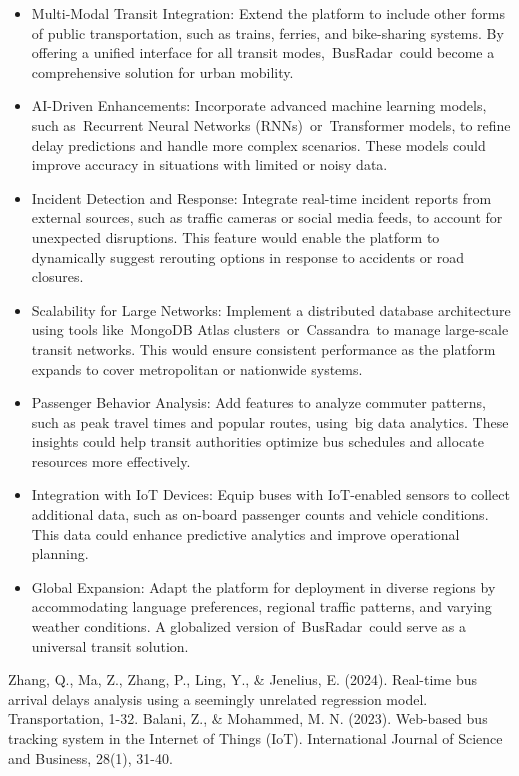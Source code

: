 \documentclass[conference]{IEEEtran}
\begin{document}
\begin{itemize}
    \item Multi-Modal Transit Integration: Extend the platform to include other forms of public transportation, such as trains, ferries, and bike-sharing systems. By offering a unified interface for all transit modes, BusRadar could become a comprehensive solution for urban mobility.
    \item AI-Driven Enhancements: Incorporate advanced machine learning models, such as Recurrent Neural Networks (RNNs) or Transformer models, to refine delay predictions and handle more complex scenarios. These models could improve accuracy in situations with limited or noisy data.
    \item Incident Detection and Response: Integrate real-time incident reports from external sources, such as traffic cameras or social media feeds, to account for unexpected disruptions. This feature would enable the platform to dynamically suggest rerouting options in response to accidents or road closures.
    \item Scalability for Large Networks: Implement a distributed database architecture using tools like MongoDB Atlas clusters or Cassandra to manage large-scale transit networks. This would ensure consistent performance as the platform expands to cover metropolitan or nationwide systems.
    \item Passenger Behavior Analysis: Add features to analyze commuter patterns, such as peak travel times and popular routes, using big data analytics. These insights could help transit authorities optimize bus schedules and allocate resources more effectively.
    \item Integration with IoT Devices: Equip buses with IoT-enabled sensors to collect additional data, such as on-board passenger counts and vehicle conditions. This data could enhance predictive analytics and improve operational planning.
    \item Global Expansion: Adapt the platform for deployment in diverse regions by accommodating language preferences, regional traffic patterns, and varying weather conditions. A globalized version of BusRadar could serve as a universal transit solution.
\end{itemize}

\begin{thebibliography}{00}
 Zhang, Q., Ma, Z., Zhang, P., Ling, Y., & Jenelius, E. (2024). Real-time bus arrival delays analysis using a seemingly unrelated regression model. Transportation, 1-32. 
 Balani, Z., & Mohammed, M. N. (2023). Web-based bus tracking system in the Internet of Things (IoT). International Journal of Science and Business, 28(1), 31-40. 
\end{thebibliography}
\end{document}
